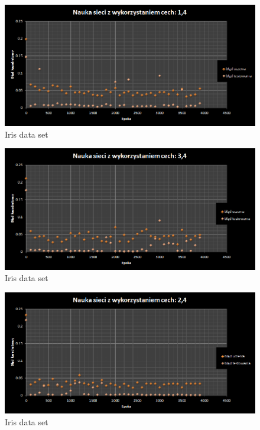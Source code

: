\documentclass{classrep}
\begin{document}
\begin{figure}[ht]
\centering
			\includegraphics[scale=0.65]{pictures/Iris07.png}
	\caption{Iris data set}
	\label{fig:Iris data set}
\end{figure}

\begin{figure}[ht]
\centering
			\includegraphics[scale=0.65]{pictures/Iris08.png}
	\caption{Iris data set}
	\label{fig:Iris data set}
\end{figure}

\begin{figure}[ht]
\centering
			\includegraphics[scale=0.65]{pictures/Iris09.png}
	\caption{Iris data set}
	\label{fig:Iris data set}
\end{figure}
\end{document}
